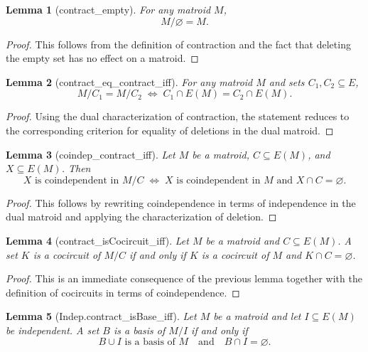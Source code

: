 \documentclass{article}
\newtheorem{lemma}{Lemma}
\begin{document}
\begin{lemma}[contract_empty]
For any matroid \( M \),
\[
M / \varnothing = M .
\]
\end{lemma}

\begin{proof}
This follows from the definition of contraction and the fact that deleting the empty set
has no effect on a matroid.
\end{proof}

\begin{lemma}[contract_eq_contract_iff]
For any matroid \( M \) and sets \( C_1, C_2 \subseteq E \),
\[
M / C_1 = M / C_2
\;\Longleftrightarrow\;
C_1 \cap E(M) = C_2 \cap E(M).
\]
\end{lemma}

\begin{proof}
Using the dual characterization of contraction, the statement reduces to the corresponding
criterion for equality of deletions in the dual matroid.
\end{proof}

\begin{lemma}[coindep_contract_iff]
Let \( M \) be a matroid, \( C \subseteq E(M) \), and \( X \subseteq E(M) \).
Then
\[
X \text{ is coindependent in } M / C
\;\Longleftrightarrow\;
X \text{ is coindependent in } M \text{ and } X \cap C = \varnothing .
\]
\end{lemma}

\begin{proof}
This follows by rewriting coindependence in terms of independence in the dual matroid
and applying the characterization of deletion.
\end{proof}

\begin{lemma}[contract_isCocircuit_iff]
Let \( M \) be a matroid and \( C \subseteq E(M) \).
A set \( K \) is a cocircuit of \( M / C \) if and only if
\( K \) is a cocircuit of \( M \) and \( K \cap C = \varnothing \).
\end{lemma}

\begin{proof}
This is an immediate consequence of the previous lemma together with the definition
of cocircuits in terms of coindependence.
\end{proof}

\begin{lemma}[Indep.contract_isBase_iff]
Let \( M \) be a matroid and let \( I \subseteq E(M) \) be independent.
A set \( B \) is a basis of \( M / I \) if and only if
\[
B \cup I \text{ is a basis of } M
\quad\text{and}\quad
B \cap I = \varnothing .
\]
\end{lemma}
\end{document}
